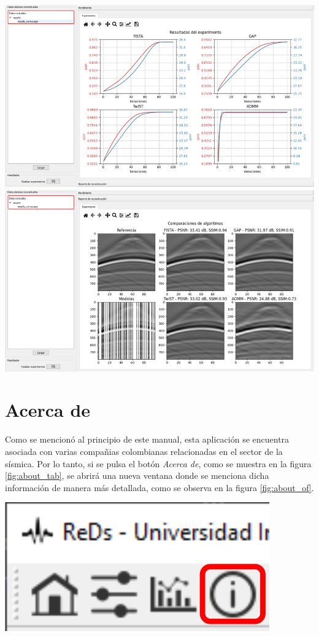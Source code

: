\documentclass[12pt,twoside,letter]{ol-softwaremanual}
\newenvironment{Figure}
  {\par\medskip\noindent\minipage{\linewidth}}
  {\endminipage\par\medskip}
\begin{document}
\begin{Figure}
	\centering
	\includegraphics[width=1\linewidth]{report-6.png}
	\label{fig:report_6}
\end{Figure}

\section{Acerca de}

Como se mencionó al principio de este manual, esta aplicación se encuentra asociada con varias compañias colombianas relacionadas en el sector de la sísmica. Por lo tanto, si se pulsa el botón \emph{Acerca de}, como se muestra en la figura \ref{fig:about_tab}, se abrirá una nueva ventana donde se menciona dicha información de manera más detallada, como se observa en la figura \ref{fig:about_of}.

\begin{Figure}
    \centering
    \includegraphics[width=0.25\linewidth]{about-tab.png}
    \label{fig:about_tab}
\end{Figure}
\end{document}
